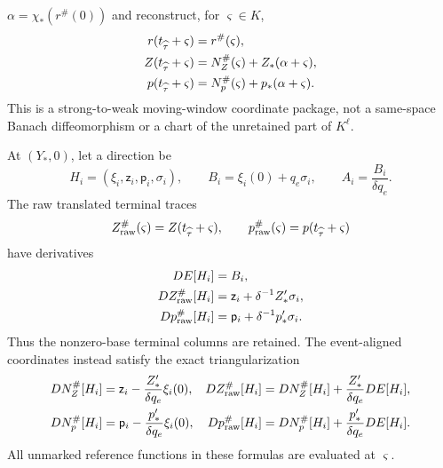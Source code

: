 \begin{lemma}
\(\alpha=\chi_*(r^\#(0))\) and reconstruct, for
\(\varsigma\in K\),
\begin{align}
 r(t_{\widehat\tau}+\varsigma)&=r^\#(\varsigma),\notag\\
 Z(t_{\widehat\tau}+\varsigma)
 &=N_Z^\#(\varsigma)+Z_*(\alpha+\varsigma),\notag\\
 p(t_{\widehat\tau}+\varsigma)
 &=N_p^\#(\varsigma)+p_*(\alpha+\varsigma).
                                                        \label{eq:trace-scale-reconstruction}
\end{align}
This is a strong-to-weak moving-window coordinate package, not a
same-space Banach diffeomorphism or a chart of the unretained part of
\(K^\ell\).

At \((Y_*,0)\), let a direction be
\[
 H_i=(\xi_i,\mathsf z_i,\mathsf p_i,\sigma_i),
 \qquad
 B_i=\xi_i(0)+q_e\sigma_i,\qquad
 A_i=\frac{B_i}{\delta q_e}.                      \label{eq:trace-scale-first-data}
\]
The raw translated terminal traces
\[
 Z_{\rm raw}^\#(\varsigma)=Z(t_{\widehat\tau}+\varsigma),
 \qquad
 p_{\rm raw}^\#(\varsigma)=p(t_{\widehat\tau}+\varsigma)
\]
have derivatives
\begin{align}
 DE[H_i]&=B_i,\notag\\
 DZ_{\rm raw}^\#[H_i]
 &=\mathsf z_i+\delta^{-1}Z_*'\sigma_i,\notag\\
 Dp_{\rm raw}^\#[H_i]
 &=\mathsf p_i+\delta^{-1}p_*'\sigma_i.           \label{eq:trace-scale-raw-first}
\end{align}
Thus the nonzero-base terminal columns are retained.  The event-aligned
coordinates instead satisfy the exact triangularization
\begin{align}
 DN_Z^\#[H_i]
 &=\mathsf z_i-\frac{Z_*'}{\delta q_e}\xi_i(0),
 &DZ_{\rm raw}^\#[H_i]
 &=DN_Z^\#[H_i]+\frac{Z_*'}{\delta q_e}DE[H_i],
 \notag\\
 DN_p^\#[H_i]
 &=\mathsf p_i-\frac{p_*'}{\delta q_e}\xi_i(0),
 &Dp_{\rm raw}^\#[H_i]
 &=DN_p^\#[H_i]+\frac{p_*'}{\delta q_e}DE[H_i].
                                                        \label{eq:trace-scale-first-triangularization}
\end{align}
All unmarked reference functions in these formulas are evaluated at
\(\varsigma\).


\end{lemma}
